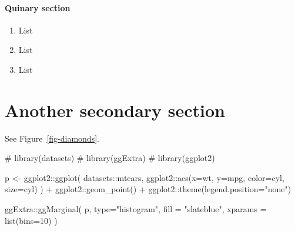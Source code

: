 \documentclass[
12pt,
openright,
oneside,
a4paper,
chapter=TITLE,
section=TITLE,
french,
spanish,
brazil,
english
]{abntex2}\usepackage{array}
\let\oldparagraph\paragraph
\renewcommand{\paragraph}[1]{\oldparagraph{#1}\mbox{}}
\newenvironment{Shaded}{\begin{snugshade}}{\end{snugshade}}
\newcommand{\AttributeTok}[1]{\textcolor[rgb]{0.40,0.45,0.13}{#1}}
\newcommand{\CommentTok}[1]{\textcolor[rgb]{0.37,0.37,0.37}{#1}}
\newcommand{\DecValTok}[1]{\textcolor[rgb]{0.68,0.00,0.00}{#1}}
\newcommand{\FunctionTok}[1]{\textcolor[rgb]{0.28,0.35,0.67}{#1}}
\newcommand{\NormalTok}[1]{\textcolor[rgb]{0.00,0.23,0.31}{#1}}
\newcommand{\OtherTok}[1]{\textcolor[rgb]{0.00,0.23,0.31}{#1}}
\newcommand{\SpecialCharTok}[1]{\textcolor[rgb]{0.37,0.37,0.37}{#1}}
\newcommand{\StringTok}[1]{\textcolor[rgb]{0.13,0.47,0.30}{#1}}
\theoremstyle{plain}
\theoremstyle{remark}
\begin{document}
\paragraph{Quinary section}\label{quinary-section}

\begin{enumerate}
\def\labelenumi{\arabic{enumi}.}
\tightlist
\item
  List
\item
  List
\item
  List
\end{enumerate}

\section{Another secondary section}\label{another-secondary-section}

See Figure~\ref{fig-diamonds}.


\begin{Shaded}
\begin{Highlighting}[numbers=left,,]
\CommentTok{\# library(datasets)}
\CommentTok{\# library(ggExtra)}
\CommentTok{\# library(ggplot2)}

\NormalTok{p }\OtherTok{\textless{}{-}}\NormalTok{ ggplot2}\SpecialCharTok{::}\FunctionTok{ggplot}\NormalTok{(}
\NormalTok{  datasets}\SpecialCharTok{::}\NormalTok{mtcars, ggplot2}\SpecialCharTok{::}\FunctionTok{aes}\NormalTok{(}\AttributeTok{x=}\NormalTok{wt, }\AttributeTok{y=}\NormalTok{mpg, }\AttributeTok{color=}\NormalTok{cyl, }\AttributeTok{size=}\NormalTok{cyl)}
\NormalTok{  ) }\SpecialCharTok{+}
\NormalTok{  ggplot2}\SpecialCharTok{::}\FunctionTok{geom\_point}\NormalTok{() }\SpecialCharTok{+}
\NormalTok{  ggplot2}\SpecialCharTok{::}\FunctionTok{theme}\NormalTok{(}\AttributeTok{legend.position=}\StringTok{"none"}\NormalTok{)}

\NormalTok{ggExtra}\SpecialCharTok{::}\FunctionTok{ggMarginal}\NormalTok{(}
\NormalTok{  p, }\AttributeTok{type=}\StringTok{"histogram"}\NormalTok{, }
  \AttributeTok{fill =} \StringTok{"slateblue"}\NormalTok{, }
  \AttributeTok{xparams =} \FunctionTok{list}\NormalTok{(}\AttributeTok{bins=}\DecValTok{10}\NormalTok{)}
\NormalTok{  )}
\end{Highlighting}
\end{Shaded}
\end{document}
